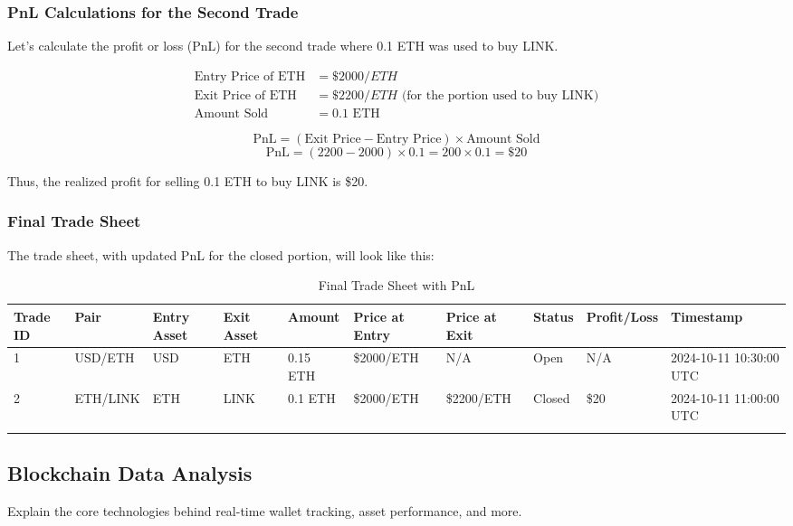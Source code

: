 \documentclass{article}
\begin{document}
\subsubsection{PnL Calculations for the Second Trade}

Let’s calculate the profit or loss (PnL) for the second trade where 0.1 ETH was used to buy LINK.

\begin{align*}
\text{Entry Price of ETH} &= \$2000/ETH \\
\text{Exit Price of ETH} &= \$2200/ETH \text{ (for the portion used to buy LINK)} \\
\text{Amount Sold} &= 0.1 \text{ ETH}
\end{align*}

\[
\text{PnL} = (\text{Exit Price} - \text{Entry Price}) \times \text{Amount Sold}
\]
\[
\text{PnL} = (2200 - 2000) \times 0.1 = 200 \times 0.1 = \$20
\]

Thus, the realized profit for selling 0.1 ETH to buy LINK is \$20.

\subsubsection{Final Trade Sheet}

The trade sheet, with updated PnL for the closed portion, will look like this:

\begin{center}
  \scriptsize %
  \begin{longtable}{|p{0.8cm}|p{1.2cm}|p{1.5cm}|p{1.5cm}|p{1cm}|p{1.5cm}|p{1.5cm}|p{1cm}|p{1.5cm}|p{1.5cm}|}
  \hline
  \textbf{Trade ID} & \textbf{Pair} & \textbf{Entry Asset} & \textbf{Exit Asset} & \textbf{Amount} & \textbf{Price at Entry} & \textbf{Price at Exit} & \textbf{Status} & \textbf{Profit/Loss} & \textbf{Timestamp} \\
  \hline
  1 & USD/ETH & USD & ETH & 0.15 ETH & \$2000/ETH & N/A & Open & N/A & 2024-10-11 10:30:00 UTC \\
  \hline
  2 & ETH/LINK & ETH & LINK & 0.1 ETH & \$2000/ETH & \$2200/ETH & Closed & \$20 & 2024-10-11 11:00:00 UTC \\
  \hline
  \caption{Final Trade Sheet with PnL}
  \end{longtable}
  \end{center}
\subsection{Blockchain Data Analysis}
Explain the core technologies behind real-time wallet tracking, asset performance, and more.
\end{document}
